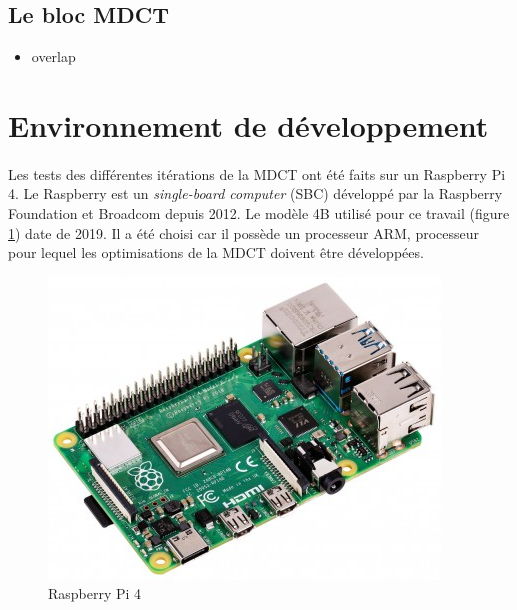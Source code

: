 \documentclass{article}
\begin{document}



    \subsection{Le bloc MDCT}

    \begin{itemize}
        \item overlap
    \end{itemize}



    \newpage
    \section{Environnement de développement}

    \paragraph{}
    Les tests des différentes itérations de la MDCT ont été faits sur un Raspberry Pi 4. Le Raspberry est un \emph{single-board computer} (SBC) développé par la Raspberry Foundation et Broadcom depuis 2012. Le modèle 4B utilisé pour ce travail (figure \ref{fig:raspberry}) date de 2019. Il a été choisi car il possède un processeur ARM, processeur pour lequel les optimisations de la MDCT doivent être développées\cite{raspberry-doc}.

    \begin{figure}[H]
        \centering
        \includegraphics[width=.4\linewidth]{./images/raspberry.png}
        \caption{Raspberry Pi 4}
        \label{fig:raspberry}
    \end{figure}
\end{document}

